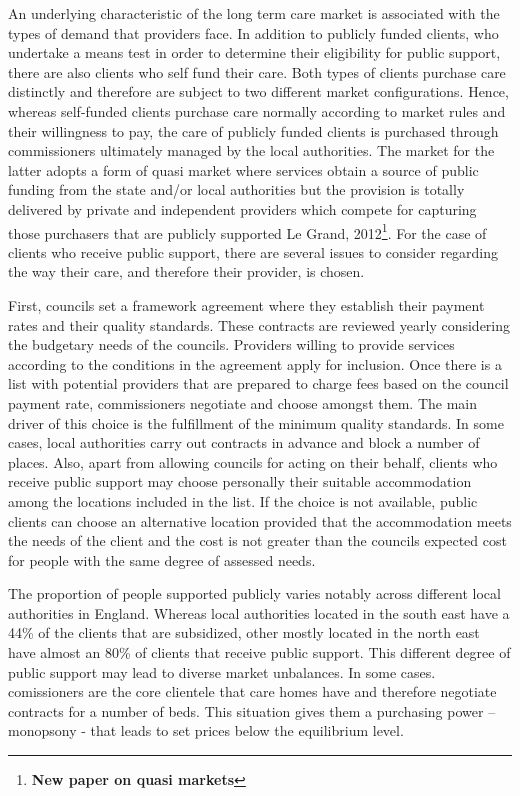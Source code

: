 \documentclass[12pt,letterpaper]{article}
\begin{document}
 An underlying characteristic of the long term care market is associated with the types of demand that 
 providers face. In addition to publicly funded clients, who undertake a means test in order to determine 
 their eligibility for public support, there are also clients who self fund their care. Both types of clients
  purchase care distinctly and therefore are subject to two different market 
  configurations. Hence, 
  whereas self-funded clients purchase care normally according to market rules and their willingness
   to pay, the care of publicly funded clients is purchased through commissioners ultimately managed
    by the local authorities. The market for the latter adopts a form of quasi market where services obtain 
    a source of public funding from the state and/or local authorities but the provision is totally
     delivered by private and independent providers which compete for capturing those purchasers 
     that are publicly supported Le Grand, 2012\footnote{\bf{New paper on quasi markets}}. For the case of clients who receive public support, 
     there are several issues to consider regarding the way their care, and therefore their provider,
      is chosen. 

First, councils set a framework agreement where they establish their payment rates and their quality
 standards. These contracts are reviewed yearly considering the budgetary needs of the councils. 
 Providers willing to provide services according to the conditions in the agreement apply for inclusion.
  Once there is a list with potential providers that are prepared to charge fees based on the council
   payment rate, commissioners negotiate and choose amongst them. The main 
   driver of this choice is the fulfillment of the minimum quality standards. In some cases, local authorities
    carry out contracts in advance and block a number of places. Also, apart from allowing councils for
     acting on their behalf, clients who receive public support may choose personally their suitable
      accommodation among the locations included in the list. If the choice is not available, public clients 
      can choose an alternative location provided that the accommodation meets the needs of the client
       and the cost is not greater than the councils expected cost for people with the same degree of assessed needs.

The proportion of people supported publicly varies notably across different local authorities in England. 
Whereas local authorities located in the south east have a 44\% of the clients that are subsidized,
 other mostly located in the north east have almost an 80\% of clients that receive public support. This different
 degree of public support may lead to diverse market unbalances. In some cases. comissioners are the core clientele
 that care homes have and therefore negotiate contracts for a number of beds. This situation gives 
 them a purchasing power – monopsony - that leads to set prices below the equilibrium level.
  
\end{document}
